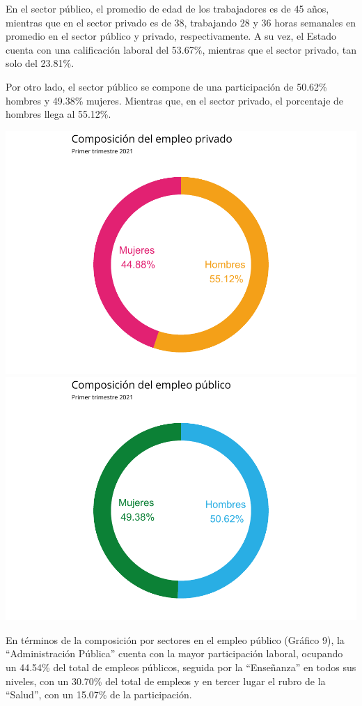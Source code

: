 \documentclass[
]{article}
\begin{document}
En el sector público, el promedio de edad de los trabajadores es de 45
años, mientras que en el sector privado es de 38, trabajando 28 y 36
horas semanales en promedio en el sector público y privado,
respectivamente. A su vez, el Estado cuenta con una calificación laboral
del 53.67\%, mientras que el sector privado, tan solo del 23.81\%.

Por otro lado, el sector público se compone de una participación de
50.62\% hombres y 49.38\% mujeres. Mientras que, en el sector privado,
el porcentaje de hombres llega al 55.12\%.

\includegraphics{Informe-Mercado-Laboral_files/figure-latex/unnamed-chunk-30-1.pdf}
\includegraphics{Informe-Mercado-Laboral_files/figure-latex/unnamed-chunk-30-2.pdf}

En términos de la composición por sectores en el empleo público (Gráfico
9), la ``Administración Pública'' cuenta con la mayor participación
laboral, ocupando un 44.54\% del total de empleos públicos, seguida por
la ``Enseñanza'' en todos sus niveles, con un 30.70\% del total de
empleos y en tercer lugar el rubro de la ``Salud'', con un 15.07\% de la
participación.
\end{document}
